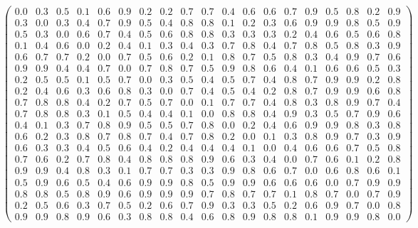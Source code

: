 \documentclass[11pt,a4paper]{report}
\begin{document}
$$
\begin{pmatrix}
0.0 & 0.3 & 0.5 & 0.1 & 0.6 & 0.9 & 0.2 & 0.2 & 0.7 & 0.7 & 0.4 & 0.6 & 0.6 & 0.7 & 0.9 & 0.5 & 0.8 & 0.2 & 0.9 \\
0.3 & 0.0 & 0.3 & 0.4 & 0.7 & 0.9 & 0.5 & 0.4 & 0.8 & 0.8 & 0.1 & 0.2 & 0.3 & 0.6 & 0.9 & 0.9 & 0.8 & 0.5 & 0.9 \\
0.5 & 0.3 & 0.0 & 0.6 & 0.7 & 0.4 & 0.5 & 0.6 & 0.8 & 0.8 & 0.3 & 0.3 & 0.3 & 0.2 & 0.4 & 0.6 & 0.5 & 0.6 & 0.8 \\
0.1 & 0.4 & 0.6 & 0.0 & 0.2 & 0.4 & 0.1 & 0.3 & 0.4 & 0.3 & 0.7 & 0.8 & 0.4 & 0.7 & 0.8 & 0.5 & 0.8 & 0.3 & 0.9 \\
0.6 & 0.7 & 0.7 & 0.2 & 0.0 & 0.7 & 0.5 & 0.6 & 0.2 & 0.1 & 0.8 & 0.7 & 0.5 & 0.8 & 0.3 & 0.4 & 0.9 & 0.7 & 0.6 \\
0.9 & 0.9 & 0.4 & 0.4 & 0.7 & 0.0 & 0.7 & 0.8 & 0.7 & 0.5 & 0.9 & 0.8 & 0.6 & 0.4 & 0.1 & 0.6 & 0.6 & 0.5 & 0.3 \\
0.2 & 0.5 & 0.5 & 0.1 & 0.5 & 0.7 & 0.0 & 0.3 & 0.5 & 0.4 & 0.5 & 0.7 & 0.4 & 0.8 & 0.7 & 0.9 & 0.9 & 0.2 & 0.8 \\
0.2 & 0.4 & 0.6 & 0.3 & 0.6 & 0.8 & 0.3 & 0.0 & 0.7 & 0.4 & 0.5 & 0.4 & 0.2 & 0.8 & 0.7 & 0.9 & 0.9 & 0.6 & 0.8 \\
0.7 & 0.8 & 0.8 & 0.4 & 0.2 & 0.7 & 0.5 & 0.7 & 0.0 & 0.1 & 0.7 & 0.7 & 0.4 & 0.8 & 0.3 & 0.8 & 0.9 & 0.7 & 0.4 \\
0.7 & 0.8 & 0.8 & 0.3 & 0.1 & 0.5 & 0.4 & 0.4 & 0.1 & 0.0 & 0.8 & 0.8 & 0.4 & 0.9 & 0.3 & 0.5 & 0.7 & 0.9 & 0.6 \\
0.4 & 0.1 & 0.3 & 0.7 & 0.8 & 0.9 & 0.5 & 0.5 & 0.7 & 0.8 & 0.0 & 0.2 & 0.4 & 0.6 & 0.9 & 0.9 & 0.8 & 0.3 & 0.8 \\
0.6 & 0.2 & 0.3 & 0.8 & 0.7 & 0.8 & 0.7 & 0.4 & 0.7 & 0.8 & 0.2 & 0.0 & 0.1 & 0.3 & 0.8 & 0.9 & 0.7 & 0.3 & 0.9 \\
0.6 & 0.3 & 0.3 & 0.4 & 0.5 & 0.6 & 0.4 & 0.2 & 0.4 & 0.4 & 0.4 & 0.1 & 0.0 & 0.4 & 0.6 & 0.6 & 0.7 & 0.5 & 0.8 \\
0.7 & 0.6 & 0.2 & 0.7 & 0.8 & 0.4 & 0.8 & 0.8 & 0.8 & 0.9 & 0.6 & 0.3 & 0.4 & 0.0 & 0.7 & 0.6 & 0.1 & 0.2 & 0.8 \\
0.9 & 0.9 & 0.4 & 0.8 & 0.3 & 0.1 & 0.7 & 0.7 & 0.3 & 0.3 & 0.9 & 0.8 & 0.6 & 0.7 & 0.0 & 0.6 & 0.8 & 0.6 & 0.1 \\
0.5 & 0.9 & 0.6 & 0.5 & 0.4 & 0.6 & 0.9 & 0.9 & 0.8 & 0.5 & 0.9 & 0.9 & 0.6 & 0.6 & 0.6 & 0.0 & 0.7 & 0.9 & 0.9 \\
0.8 & 0.8 & 0.5 & 0.8 & 0.9 & 0.6 & 0.9 & 0.9 & 0.9 & 0.7 & 0.8 & 0.7 & 0.7 & 0.1 & 0.8 & 0.7 & 0.0 & 0.7 & 0.9 \\
0.2 & 0.5 & 0.6 & 0.3 & 0.7 & 0.5 & 0.2 & 0.6 & 0.7 & 0.9 & 0.3 & 0.3 & 0.5 & 0.2 & 0.6 & 0.9 & 0.7 & 0.0 & 0.8 \\
0.9 & 0.9 & 0.8 & 0.9 & 0.6 & 0.3 & 0.8 & 0.8 & 0.4 & 0.6 & 0.8 & 0.9 & 0.8 & 0.8 & 0.1 & 0.9 & 0.9 & 0.8 & 0.0
\end{pmatrix}
$$
\end{document}
